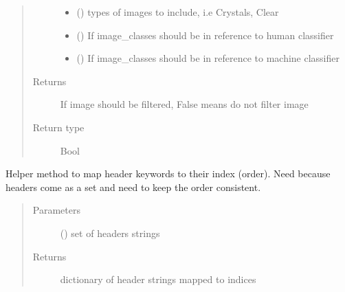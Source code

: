 \documentclass[letterpaper,10pt,english]{sphinxmanual}
\begin{document}
\begin{fulllineitems}
\begin{fulllineitems}
\begin{quote}
\begin{description}
\begin{itemize}
\item {} 
 () \textendash{} types of images to include, i.e Crystals, Clear

\item {} 
 () \textendash{} If image\_classes should be in reference to human classifier

\item {} 
 () \textendash{} If image\_classes should be in reference to machine classifier

\end{itemize}

\item[{Returns}] \leavevmode
If image should be filtered, False means do not filter image

\item[{Return type}] \leavevmode
Bool

\end{description}\end{quote}

\end{fulllineitems}


\begin{fulllineitems}
\label{\detokenize{polo.widgets:polo.widgets.table_viewer.TableViewer.make_header_map}}
Helper method to map header keywords to their index (order). Need
because headers come as a set and need to keep the order consistent.
\begin{quote}\begin{description}
\item[{Parameters}] \leavevmode
{} () \textendash{} set of headers strings

\item[{Returns}] \leavevmode
dictionary of header strings mapped to indices


\end{description}
\end{quote}
\end{fulllineitems}
\end{fulllineitems}
\end{document}
